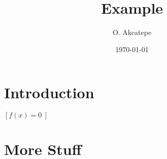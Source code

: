 \documentclass{article}
\title{Example}
\author{O. Akcatepe}
\date{\today}
\begin{document}
\maketitle

\section{Introduction}
$[f(x)=0\ ]$ 

\section{More Stuff}
\end{document}
